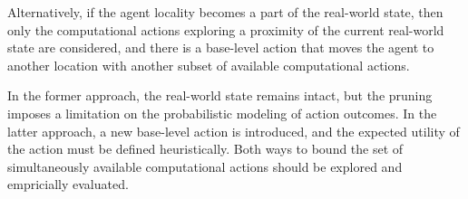 Alternatively, if the agent locality becomes a part of the real-world
state, then only the computational actions exploring a proximity of
the current real-world state are considered, and there is a base-level
action that moves the agent to another location with another subset of
available computational actions.

In the former approach, the real-world state remains intact, but
the pruning imposes a limitation on the probabilistic modeling of action
outcomes. In the latter approach, a new base-level action is
introduced, and the expected utility of the action must be defined
heuristically. Both ways to bound the set of simultaneously available
computational actions should be explored and empricially evaluated.

